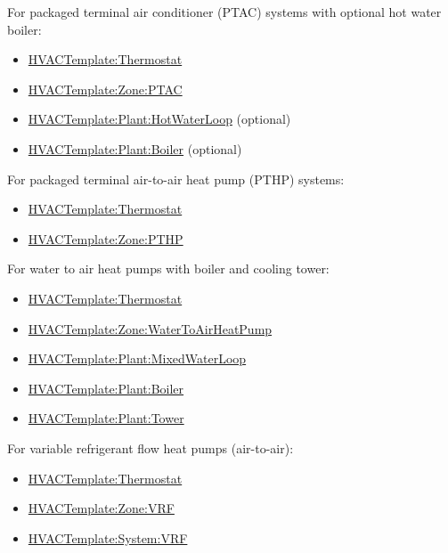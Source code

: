 For packaged terminal air conditioner (PTAC) systems with optional hot water boiler:

\begin{itemize}
\item
  \hyperref[hvactemplatethermostat]{HVACTemplate:Thermostat}
\item
  \hyperref[hvactemplatezoneptac]{HVACTemplate:Zone:PTAC}
\item
  \hyperref[hvactemplateplanthotwaterloop]{HVACTemplate:Plant:HotWaterLoop} (optional)
\item
  \hyperref[hvactemplateplantboiler]{HVACTemplate:Plant:Boiler} (optional)
\end{itemize}

For packaged terminal air-to-air heat pump (PTHP) systems:

\begin{itemize}
\item
  \hyperref[hvactemplatethermostat]{HVACTemplate:Thermostat}
\item
  \hyperref[hvactemplatezonepthp]{HVACTemplate:Zone:PTHP}
\end{itemize}

For water to air heat pumps with boiler and cooling tower:

\begin{itemize}
\item
  \hyperref[hvactemplatethermostat]{HVACTemplate:Thermostat}
\item
  \hyperref[hvactemplatezonewatertoairheatpump]{HVACTemplate:Zone:WaterToAirHeatPump}
\item
  \hyperref[hvactemplateplantmixedwaterloop]{HVACTemplate:Plant:MixedWaterLoop}
\item
  \hyperref[hvactemplateplantboiler]{HVACTemplate:Plant:Boiler}
\item
  \hyperref[hvactemplateplanttower]{HVACTemplate:Plant:Tower}
\end{itemize}

For variable refrigerant flow heat pumps (air-to-air):

\begin{itemize}
\item
  \hyperref[hvactemplatethermostat]{HVACTemplate:Thermostat}
\item
  \hyperref[hvactemplatezonevrf]{HVACTemplate:Zone:VRF}
\item
  \hyperref[hvactemplatesystemvrf]{HVACTemplate:System:VRF}
\end{itemize}

